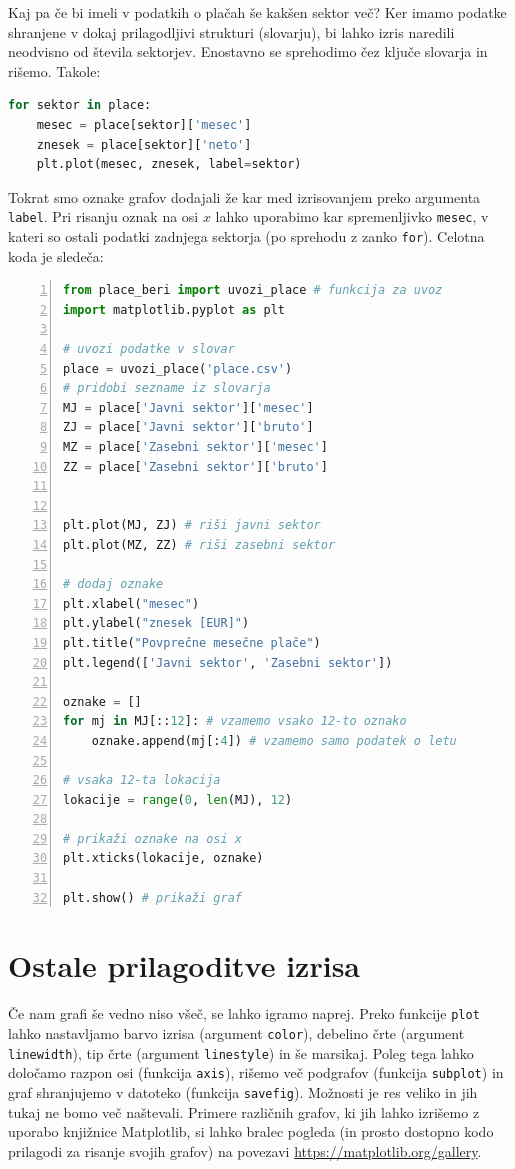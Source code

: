Kaj pa če bi imeli v podatkih o plačah še kakšen sektor več? Ker imamo podatke shranjene v dokaj prilagodljivi strukturi (slovarju), bi lahko izris naredili neodvisno od števila sektorjev. Enostavno se sprehodimo čez ključe slovarja in rišemo. Takole:
\begin{lstlisting}[language=Python]
for sektor in place:
    mesec = place[sektor]['mesec']
    znesek = place[sektor]['neto']
    plt.plot(mesec, znesek, label=sektor)
\end{lstlisting}
Tokrat smo oznake grafov dodajali že kar med izrisovanjem preko argumenta \texttt{label}. Pri risanju oznak na osi $x$ lahko uporabimo kar spremenljivko \texttt{mesec}, v kateri so ostali podatki zadnjega sektorja (po sprehodu z zanko \texttt{for}). Celotna koda je sledeča: 
\begin{lstlisting}[language=Python, showstringspaces=false,numbers=left]
from place_beri import uvozi_place # funkcija za uvoz
import matplotlib.pyplot as plt

# uvozi podatke v slovar
place = uvozi_place('place.csv')
# pridobi sezname iz slovarja
MJ = place['Javni sektor']['mesec']
ZJ = place['Javni sektor']['bruto']
MZ = place['Zasebni sektor']['mesec']
ZZ = place['Zasebni sektor']['bruto']


plt.plot(MJ, ZJ) # riši javni sektor
plt.plot(MZ, ZZ) # riši zasebni sektor

# dodaj oznake
plt.xlabel("mesec")
plt.ylabel("znesek [EUR]")
plt.title("Povprečne mesečne plače")
plt.legend(['Javni sektor', 'Zasebni sektor'])

oznake = []
for mj in MJ[::12]: # vzamemo vsako 12-to oznako
    oznake.append(mj[:4]) # vzamemo samo podatek o letu

# vsaka 12-ta lokacija
lokacije = range(0, len(MJ), 12) 

# prikaži oznake na osi x
plt.xticks(lokacije, oznake)

plt.show() # prikaži graf
\end{lstlisting}

\section{Ostale prilagoditve izrisa}
Če nam grafi še vedno niso všeč, se lahko igramo naprej. Preko funkcije \texttt{plot} lahko nastavljamo barvo izrisa (argument \texttt{color}), debelino črte (argument \texttt{linewidth}), tip črte (argument \texttt{linestyle}) in še marsikaj. Poleg tega lahko določamo razpon osi (funkcija \texttt{axis}), rišemo več podgrafov (funkcija \texttt{subplot}) in graf shranjujemo v datoteko (funkcija \texttt{savefig}). Možnosti je res veliko in jih tukaj ne bomo več naštevali. Primere različnih grafov, ki jih lahko izrišemo z uporabo knjižnice Matplotlib, si lahko bralec pogleda (in prosto dostopno kodo prilagodi za risanje svojih grafov) na povezavi \url{https://matplotlib.org/gallery}.


